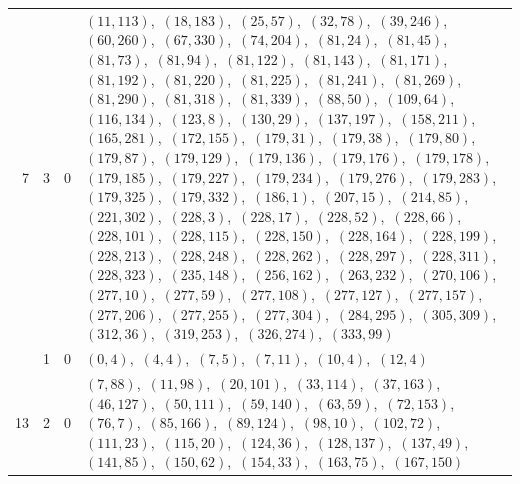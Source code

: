 \documentclass[11pt]{article}
\begin{document}
\begin{longtable}{@{}rrl>{\raggedright\arraybackslash}p{}@{}}
7 & 3 & $0$ & $(11,113)$,\allowbreak\ $(18,183)$,\allowbreak\ $(25,57)$,\allowbreak\ $(32,78)$,\allowbreak\ $(39,246)$,\allowbreak\ $(60,260)$,\allowbreak\ $(67,330)$,\allowbreak\ $(74,204)$,\allowbreak\ $(81,24)$,\allowbreak\ $(81,45)$,\allowbreak\ $(81,73)$,\allowbreak\ $(81,94)$,\allowbreak\ $(81,122)$,\allowbreak\ $(81,143)$,\allowbreak\ $(81,171)$,\allowbreak\ $(81,192)$,\allowbreak\ $(81,220)$,\allowbreak\ $(81,225)$,\allowbreak\ $(81,241)$,\allowbreak\ $(81,269)$,\allowbreak\ $(81,290)$,\allowbreak\ $(81,318)$,\allowbreak\ $(81,339)$,\allowbreak\ $(88,50)$,\allowbreak\ $(109,64)$,\allowbreak\ $(116,134)$,\allowbreak\ $(123,8)$,\allowbreak\ $(130,29)$,\allowbreak\ $(137,197)$,\allowbreak\ $(158,211)$,\allowbreak\ $(165,281)$,\allowbreak\ $(172,155)$,\allowbreak\ $(179,31)$,\allowbreak\ $(179,38)$,\allowbreak\ $(179,80)$,\allowbreak\ $(179,87)$,\allowbreak\ $(179,129)$,\allowbreak\ $(179,136)$,\allowbreak\ $(179,176)$,\allowbreak\ $(179,178)$,\allowbreak\ $(179,185)$,\allowbreak\ $(179,227)$,\allowbreak\ $(179,234)$,\allowbreak\ $(179,276)$,\allowbreak\ $(179,283)$,\allowbreak\ $(179,325)$,\allowbreak\ $(179,332)$,\allowbreak\ $(186,1)$,\allowbreak\ $(207,15)$,\allowbreak\ $(214,85)$,\allowbreak\ $(221,302)$,\allowbreak\ $(228,3)$,\allowbreak\ $(228,17)$,\allowbreak\ $(228,52)$,\allowbreak\ $(228,66)$,\allowbreak\ $(228,101)$,\allowbreak\ $(228,115)$,\allowbreak\ $(228,150)$,\allowbreak\ $(228,164)$,\allowbreak\ $(228,199)$,\allowbreak\ $(228,213)$,\allowbreak\ $(228,248)$,\allowbreak\ $(228,262)$,\allowbreak\ $(228,297)$,\allowbreak\ $(228,311)$,\allowbreak\ $(228,323)$,\allowbreak\ $(235,148)$,\allowbreak\ $(256,162)$,\allowbreak\ $(263,232)$,\allowbreak\ $(270,106)$,\allowbreak\ $(277,10)$,\allowbreak\ $(277,59)$,\allowbreak\ $(277,108)$,\allowbreak\ $(277,127)$,\allowbreak\ $(277,157)$,\allowbreak\ $(277,206)$,\allowbreak\ $(277,255)$,\allowbreak\ $(277,304)$,\allowbreak\ $(284,295)$,\allowbreak\ $(305,309)$,\allowbreak\ $(312,36)$,\allowbreak\ $(319,253)$,\allowbreak\ $(326,274)$,\allowbreak\ $(333,99)$\\
\addlinespace[3pt]
13 & 1 & $0$ & $(0,4)$,\allowbreak\ $(4,4)$,\allowbreak\ $(7,5)$,\allowbreak\ $(7,11)$,\allowbreak\ $(10,4)$,\allowbreak\ $(12,4)$\\
13 & 2 & $0$ & $(7,88)$,\allowbreak\ $(11,98)$,\allowbreak\ $(20,101)$,\allowbreak\ $(33,114)$,\allowbreak\ $(37,163)$,\allowbreak\ $(46,127)$,\allowbreak\ $(50,111)$,\allowbreak\ $(59,140)$,\allowbreak\ $(63,59)$,\allowbreak\ $(72,153)$,\allowbreak\ $(76,7)$,\allowbreak\ $(85,166)$,\allowbreak\ $(89,124)$,\allowbreak\ $(98,10)$,\allowbreak\ $(102,72)$,\allowbreak\ $(111,23)$,\allowbreak\ $(115,20)$,\allowbreak\ $(124,36)$,\allowbreak\ $(128,137)$,\allowbreak\ $(137,49)$,\allowbreak\ $(141,85)$,\allowbreak\ $(150,62)$,\allowbreak\ $(154,33)$,\allowbreak\ $(163,75)$,\allowbreak\ $(167,150)$\\

\end{longtable}
\end{document}
